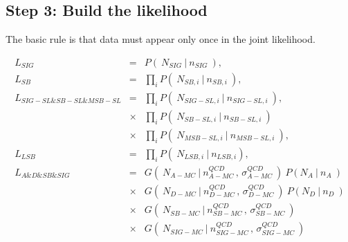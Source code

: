 \documentclass[11pt]{article}
\begin{document}
    \subsection{Step 3: Build the likelihood}
    
    The basic rule is that data must appear only once in the joint likelihood.
    
    \begin{eqnarray*}
    L_{SIG} & = & P(\ N_{SIG} \ | \ n_{SIG}\ ), \\
    L_{SB} & = & \prod_i P(\ N_{SB,i} \ | \ n_{SB,i}\ ), \\
    L_{SIG-SL\&SB-SL\&MSB-SL} & = & \prod_i P(\ N_{SIG-SL,i} \ | \ n_{SIG-SL,i}\  ), \\
               & \times & \prod_i P(\ N_{SB-SL,i} \ | \ n_{SB-SL,i}\  ) \\
               & \times & \prod_i P(\ N_{MSB-SL,i} \ | \ n_{MSB-SL,i}\  ), \\
    L_{LSB} & = & \prod_i P(\ N_{LSB,i} \ | \ n_{LSB,i} ), \\
    L_{A\&D\&SB\&SIG} & = & G(\ N_{A-MC} \ | \ n_{A-MC}^{QCD} \, ,\, \sigma_{A-MC}^{QCD} \ ) \ P(N_{A} \ | \ n_{A}\ ) \\ 
                & \times &  G(\ N_{D-MC} \ | \ n_{D-MC}^{QCD} \, ,\, \sigma_{D-MC}^{QCD} \ ) \ P(N_{D} \ | \ n_{D}\ ) \\
                & \times &  G(\ N_{SB-MC} \ | \ n_{SB-MC}^{QCD} \, , \, \sigma_{SB-MC}^{QCD} \ ) \\
                & \times &  G(\ N_{SIG-MC} \ | \ n_{SIG-MC}^{QCD}\, , \, \sigma_{SIG-MC}^{QCD} \ ) \\
    \end{eqnarray*}
    
\end{document}
